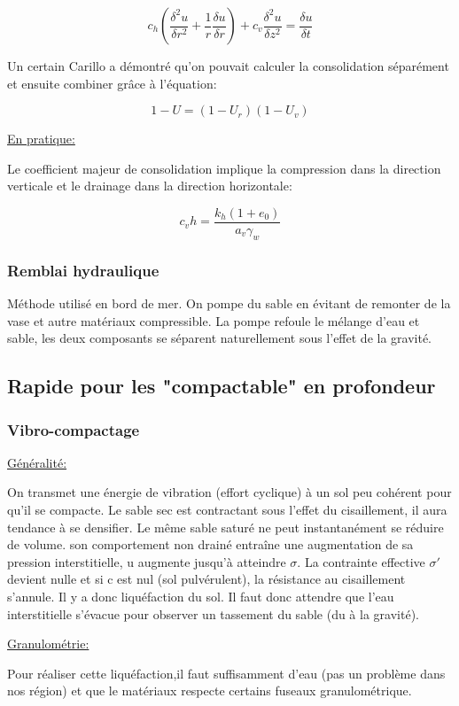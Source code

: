 $$c_h(\frac{\delta^2 u}{\delta r^2}+\frac{1}{r}\frac{\delta u}{\delta r}) + c_v\frac{\delta^2 u}{\delta z^2}= \frac{\delta u}{\delta t} $$ 

Un certain Carillo a démontré qu'on pouvait calculer la consolidation séparément et ensuite combiner grâce à l'équation:

$$ 1-U = (1-U_r)(1-U_v) $$ 

\underline{En pratique:}

Le coefficient majeur de consolidation implique la compression dans la direction verticale et le drainage dans la direction horizontale:

$$ c_vh = \frac{k_h(1+e_0)}{a_v\gamma_w}$$

\subsubsection{Remblai hydraulique}

Méthode utilisé en bord de mer. On pompe du sable en évitant de remonter de la vase et autre matériaux compressible. La pompe refoule le mélange d'eau et sable, les deux composants se séparent naturellement sous l'effet de la gravité.

\subsection{Rapide pour les "compactable" en profondeur}

\subsubsection{Vibro-compactage}

\underline{Généralité:} 

On transmet une énergie de vibration (effort cyclique) à un sol peu cohérent pour qu'il se compacte. Le sable sec est contractant sous l'effet du cisaillement, il aura tendance à se densifier. Le même sable saturé ne peut instantanément se réduire de volume. son comportement non drainé entraîne une augmentation de sa pression interstitielle, u augmente jusqu'à atteindre $\sigma$. La contrainte effective $\sigma'$ devient nulle et si c est nul (sol pulvérulent), la résistance au cisaillement s'annule. Il y a donc liquéfaction du sol. Il faut donc attendre que l'eau interstitielle s'évacue pour observer un tassement du sable (du à la gravité).

\underline{Granulométrie:} 

Pour réaliser cette liquéfaction,il faut suffisamment d'eau (pas un problème dans nos région) et que le matériaux respecte certains fuseaux granulométrique.

